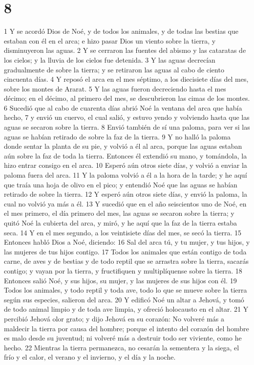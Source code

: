 \chapter{8}

1 Y se acordó Dios de Noé, y de todos los animales, y de todas las bestias que estaban con él en el arca; e hizo pasar Dios un viento sobre la tierra, y disminuyeron las aguas.
2 Y se cerraron las fuentes del abismo y las cataratas de los cielos; y la lluvia de los cielos fue detenida.
3 Y las aguas decrecían gradualmente de sobre la tierra; y se retiraron las aguas al cabo de ciento cincuenta días.
4 Y reposó el arca en el mes séptimo, a los diecisiete días del mes, sobre los montes de Ararat.
5 Y las aguas fueron decreciendo hasta el mes décimo; en el décimo, al primero del mes, se descubrieron las cimas de los montes.
6 Sucedió que al cabo de cuarenta días abrió Noé la ventana del arca que había hecho,
7 y envió un cuervo, el cual salió, y estuvo yendo y volviendo hasta que las aguas se secaron sobre la tierra.
8 Envió también de sí una paloma, para ver si las aguas se habían retirado de sobre la faz de la tierra.
9 Y no halló la paloma donde sentar la planta de su pie, y volvió a él al arca, porque las aguas estaban aún sobre la faz de toda la tierra. Entonces él extendió su mano, y tomándola, la hizo entrar consigo en el arca.
10 Esperó aún otros siete días, y volvió a enviar la paloma fuera del arca.
11 Y la paloma volvió a él a la hora de la tarde; y he aquí que traía una hoja de olivo en el pico; y entendió Noé que las aguas se habían retirado de sobre la tierra.
12 Y esperó aún otros siete días, y envió la paloma, la cual no volvió ya más a él.
13 Y sucedió que en el año seiscientos uno de Noé, en el mes primero, el día primero del mes, las aguas se secaron sobre la tierra; y quitó Noé la cubierta del arca, y miró, y he aquí que la faz de la tierra estaba seca.
14 Y en el mes segundo, a los veintisiete días del mes, se secó la tierra.
15 Entonces habló Dios a Noé, diciendo:
16 Sal del arca tú, y tu mujer, y tus hijos, y las mujeres de tus hijos contigo.
17 Todos los animales que están contigo de toda carne, de aves y de bestias y de todo reptil que se arrastra sobre la tierra, sacarás contigo; y vayan por la tierra, y fructifiquen y multiplíquense sobre la tierra.
18 Entonces salió Noé, y sus hijos, su mujer, y las mujeres de sus hijos con él.
19 Todos los animales, y todo reptil y toda ave, todo lo que se mueve sobre la tierra según sus especies, salieron del arca.
20 Y edificó Noé un altar a Jehová, y tomó de todo animal limpio y de toda ave limpia, y ofreció holocausto en el altar.
21 Y percibió Jehová olor grato; y dijo Jehová en su corazón: No volveré más a maldecir la tierra por causa del hombre; porque el intento del corazón del hombre es malo desde su juventud; ni volveré más a destruir todo ser viviente, como he hecho.
22 Mientras la tierra permanezca, no cesarán la sementera y la siega, el frío y el calor, el verano y el invierno, y el día y la noche.

